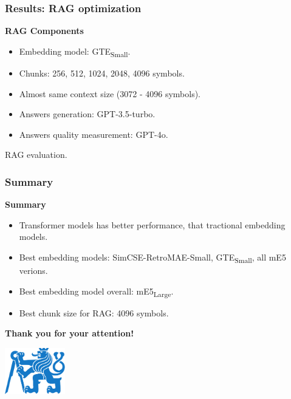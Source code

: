 \documentclass{beamer}
\newif\ifplacelogo
\begin{document}
\begin{frame}
  \frametitle{Results: RAG optimization}
  \textcolor{cvut_navy}{\textbf{RAG Components}}
  \begin{itemize}
    \item Embedding model: GTE\textsubscript{Small}.
    \item Chunks: 256, 512, 1024, 2048, 4096 symbols.
    \item Almost same context size (3072 - 4096 symbols).
    \item Answers generation: GPT-3.5-turbo.
    \item Answers quality measurement: GPT-4o.
  \end{itemize}
  
  \begin{table}
    
    \caption{RAG evaluation.}
  \end{table}
\end{frame}


\placelogofalse 
\begin{frame}
  \frametitle{Summary}
  \textcolor{cvut_navy}{\textbf{Summary}}
  \begin{itemize}
    \item Transformer models has better performance, that tractional embedding models.
    \item Best embedding models: SimCSE-RetroMAE-Small, GTE\textsubscript{Small}, all mE5 verions.
    \item Best embedding model overall: mE5\textsubscript{Large}.
    \item Best chunk size for RAG: 4096 symbols.
  \end{itemize}
  \vspace{10px}
  \begin{center}
    \huge \textcolor{cvut_navy}{\textbf{Thank you for your attention!}}  
  \end{center}
  \vspace{10px}
  \begin{center}
    \includegraphics[height=2cm]{src/fig/pdfs/ctu_logo_blue_filled.pdf}
  \end{center}
\end{frame}
\end{document}
